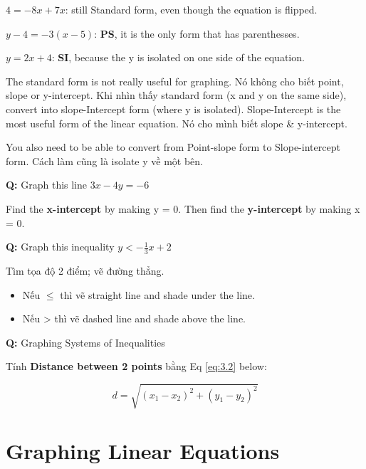 $4=-8x+7x$: still Standard form, even though the equation is flipped.

$y-4=-3(x-5)$: \textbf{PS}, it is the only form that has parenthesses.

$y=2x+4$: \textbf{SI}, because the y is isolated on one side of the equation.


\vspace{.6cm}

The standard form is not really useful for graphing. Nó không cho biết point, slope or y-intercept. Khi nhìn thấy standard form (x and y on the same side), convert into slope-Intercept form (where y is isolated). Slope-Intercept is the most useful form of the linear equation. Nó cho mình biết slope \& y-intercept.

You also need to be able to convert from Point-slope form to Slope-intercept form. Cách làm cũng là isolate y về một bên.


\vspace{2 cm}

\textbf{Q:} Graph this line \(3x-4y=-6\)

Find the \textbf{x-intercept} by making y = 0. Then find the \textbf{y-intercept} by making x = 0.

\vspace{5mm}

\textbf{Q:} Graph this inequality \(y < -\frac{1}{3}x+2\)

Tìm tọa độ 2 điểm; vẽ đường thẳng.

\begin{itemize}
  \item Nếu \(\le\) thì vẽ straight line and shade under the line.
  \item Nếu > thì vẽ dashed line and shade above the line.
\end{itemize}

\textbf{Q: }Graphing Systems of Inequalities

\vspace{5mm}

Tính \textbf{Distance between 2 points} bằng Eq \ref{eq:3.2} below:

\begin{equation}
  d = \sqrt{(x_{1}-x_{2})^{2} + (y_{1}-y_{2})^{2}}
  \label{eq:3.2}
\end{equation}

\section{Graphing Linear Equations}

